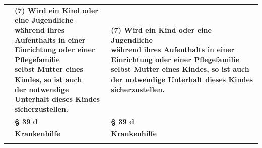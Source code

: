 \documentclass[10pt,a4paper,landscape]{article}
\begin{document}
\begin{longtable}{|L{8.2cm}|L{8.2cm}|L{8.2cm}|}
\hhline{|---|}
 & \textbf{(7) Wird ein Kind oder eine Jugendliche  \newline während ihres Aufenthalts in einer  \newline Einrichtung oder einer Pflegefamilie  \newline selbst Mutter eines Kindes, so ist auch  \newline der notwendige Unterhalt dieses Kindes  \newline sicherzustellen. } & \textbf{(7) Wird ein Kind oder eine Jugendliche  \newline während ihres Aufenthalts in einer  \newline Einrichtung oder einer Pflegefamilie  \newline selbst Mutter eines Kindes, so ist auch } \textbf{der notwendige Unterhalt dieses Kindes  \newline sicherzustellen. } \\
\hhline{|---|}
 & \textbf{\S{} 39 d } & \textbf{\S{} 39 d } \\
\hhline{|---|}
 & \textbf{Krankenhilfe } & \textbf{Krankenhilfe } \\
\hhline{|---|}

\end{longtable}
\end{document}
